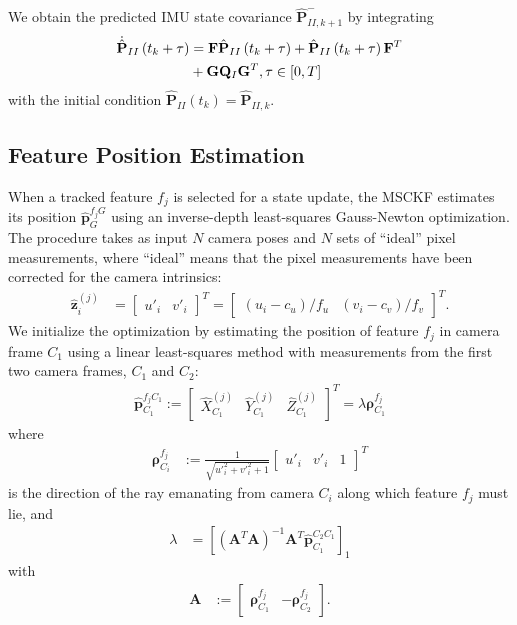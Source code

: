 \documentclass[letterpaper, 10 pt, conference]{ieeeconf}  %
\def\Vec#1{\mathbf{#1}}
\newcommand{\bbm}{\begin{bmatrix}}
\newcommand{\ebm}{\end{bmatrix}}
\begin{document}
We obtain the predicted IMU state covariance $\hat{\Vec{P}}^-_{II,k+1}$ by integrating
\begin{align} \label{eq:imucovar}
    \dot{\hat{\Vec{P}}}_{II}\left(t_k  + \tau \right) &= \Vec{F} \hat{\Vec{P}}_{II}\left(t_k  + \tau \right) 
                 + \hat{\Vec{P}}_{II}\left(t_k  + \tau \right) \Vec{F}^T \notag \\ 
                & + \Vec{G} \Vec{Q}_I \Vec{G}^T, \tau\in\left[0,T\right]
\end{align}
with the initial condition $\hat{\Vec{P}}_{II}\left(t_k\right) = \hat{\Vec{P}}_{II,k}$. 

\subsection{Feature Position Estimation}
\label{sec:featPosinvDepth}
When a tracked feature $f_j$ is selected for a state update, the MSCKF estimates its position $\hat{\Vec{p}}_G^{f_j G}$ using an inverse-depth least-squares Gauss-Newton optimization. 
The procedure takes as input $N$ camera poses and $N$ sets of ``ideal'' pixel measurements, where ``ideal'' means that the pixel measurements have been corrected for the camera intrinsics:
\begin{align}
\hat{\Vec{z}}_i^{(j)} &= \bbm u'_i & v'_i \ebm ^T = \bbm (u_i - c_u)/f_u & (v_i - c_v)/f_v \ebm ^T.
\end{align}
We initialize the optimization by estimating the position of feature $f_j$ in camera frame $C_1$ using a linear least-squares method with measurements from the first two camera frames, $C_1$ and $C_2$:
\begin{align}
\hat{\Vec{p}}_{C_1}^{f_j C_1} := \bbm \hat{X}^{(j)}_{C_1} & \hat{Y}^{(j)}_{C_1} & \hat{Z}^{(j)}_{C_1} \ebm ^T = \lambda \boldsymbol{\rho}_{C_1}^{f_j}
\end{align}
where
\begin{align}
\boldsymbol{\rho}_{C_i}^{f_j} &:= \frac{1}{\sqrt{u'^2_i + v'^2_i + 1}}\bbm u'_i & v'_i & 1\ebm^T
\end{align}
is the direction of the ray emanating from camera $C_i$ along which feature $f_j$ must lie, and
\begin{align}
\lambda &= \left[(\Vec A^T \Vec A)^{-1} \Vec A^T \hat{\Vec{p}}_{C_1}^{C_2 C_1} \right]_1
\end{align}
with
\begin{align}
\Vec A &:= \bbm \boldsymbol{\rho}_{C_1}^{f_j} & -\boldsymbol{\rho}_{C_2}^{f_j} \ebm.
\end{align}
\end{document}
